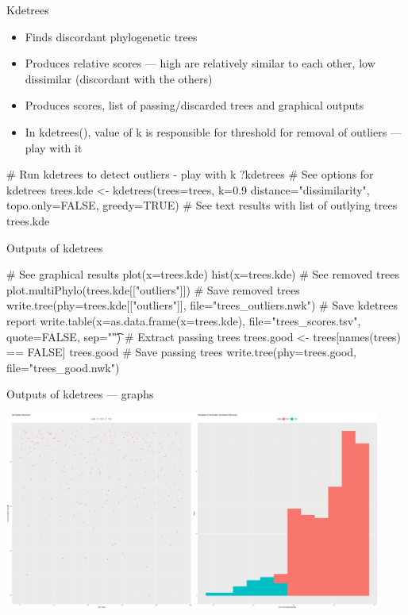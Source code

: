 \documentclass[compress,  xelatex, 11pt, xcolor=x11names, aspectratio=169,
	hyperref={
		bookmarks=true,
		unicode=true,
		colorlinks=true,
		pdftitle={HybSeq course},
		plainpages=false,
		pdfauthor={Vojtech Zeisek},
		pdfsubject={Practical processing of HybSeq target enrichment sequencing data on computing grids like MetaCentrum},
		pdfcreator={XeLaTeX},
		pdfkeywords={BASH, command line, GNU, HybSeq, Linux, MetaCentrum, sequencing shell, target enrichment},
		linkcolor=Turquoise4, %
		anchorcolor=DodgerBlue4, %
		citecolor=DodgerBlue4, %
		filecolor=DodgerBlue4, %
		menucolor=Tan4, %
		urlcolor=DarkOliveGreen4 %
		},
	url={hyphens, lowtilde} %
	]{beamer}
\renewcommand{\texttt}[1]{\colorbox{Cornsilk2}{{\ttfamily #1}}}
\renewcommand{\alert}[1]{\textcolor{OrangeRed3}{#1}}
\begin{document}
\begin{frame}[fragile]{Kdetrees}
	\begin{itemize}
		\item Finds discordant phylogenetic trees
		\item Produces relative scores --- high are relatively similar to each other, low dissimilar (discordant with the others)
		\item Produces scores, list of passing/discarded trees and graphical outputs
		\item In \texttt{kdetrees()}, \alert{value of \texttt{k} is responsible for threshold for removal of outliers --- play with it}
	\end{itemize}
	\begin{spluscode}
    # Run kdetrees to detect outliers - play with k
    ?kdetrees # See options for kdetrees
    trees.kde <- kdetrees(trees=trees, k=0.9 distance="dissimilarity",
      topo.only=FALSE, greedy=TRUE)
    # See text results with list of outlying trees
    trees.kde
	\end{spluscode}
\end{frame}

\begin{frame}[fragile]{Outputs of kdetrees}
	\begin{spluscode}
    # See graphical results
    plot(x=trees.kde)
    hist(x=trees.kde)
    # See removed trees
    plot.multiPhylo(trees.kde[["outliers"]])
    # Save removed trees
    write.tree(phy=trees.kde[["outliers"]], file="trees_outliers.nwk")
    # Save kdetrees report
    write.table(x=as.data.frame(x=trees.kde), file="trees_scores.tsv",
      quote=FALSE, sep="\t")
    # Extract passing trees
    trees.good <- trees[names(trees) %
      == FALSE]
    trees.good
    # Save passing trees
    write.tree(phy=trees.good, file="trees_good.nwk")
	\end{spluscode}
\end{frame}

\begin{frame}{Outputs of kdetrees --- graphs}
	\begin{center}
		\includegraphics[height=6.5cm]{kdetrees.png}
	\end{center}
\end{frame}
\end{document}
